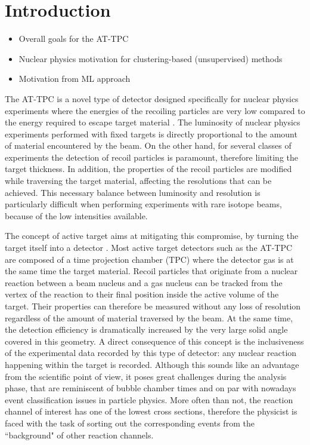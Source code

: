 \documentclass[preprint,12pt]{elsarticle}
\begin{document}
\section{Introduction}\label{sec:intro}
\begin{itemize}
    \item Overall goals for the AT-TPC
    \item Nuclear physics motivation for clustering-based (unsupervised) methods
    \item Motivation from ML approach
    
\end{itemize}
The AT-TPC \cite{Bradt2018} is a novel type of detector designed specifically for nuclear physics experiments where the energies of the recoiling particles are very low compared to the energy required to escape target material \cite{}. The luminosity of nuclear physics experiments performed with fixed targets is directly proportional to the amount of material encountered by the beam. On the other hand, for several classes of experiments the detection of recoil particles is paramount, therefore limiting the target thickness. In addition, the properties of the recoil particles are modified while traversing the target material, affecting the resolutions that can be achieved. This necessary balance between luminosity and resolution is particularly difficult when performing experiments with rare isotope beams, because of the low intensities available. 

The concept of active target aims at mitigating this compromise, by turning the target itself into a detector \cite{Beceiro2018}. Most active target detectors such as the AT-TPC are composed of a time projection chamber (TPC) where the detector gas is at the same time the target material. Recoil particles that originate from a nuclear reaction between a beam nucleus and a gas nucleus can be tracked from the vertex of the reaction to their final position inside the active volume of the target. Their properties can therefore be measured without any loss of resolution regardless of the amount of material traversed by the beam. At the same time, the detection efficiency is dramatically increased by the very large solid angle covered in this geometry. A direct consequence of this concept is the inclusiveness of the experimental data recorded by this type of detector: any nuclear reaction happening within the target is recorded. Although this sounds like an advantage from the scientific point of view, it poses great challenges during the analysis phase, that are reminiscent of bubble chamber times and on par with nowadays event classification issues in particle physics. More often than not, the reaction channel of interest has one of the lowest cross sections, therefore the physicist is faced with the task of sorting out the corresponding events from the ``background" of other reaction channels. 
\end{document}
